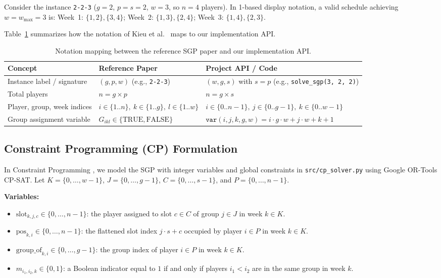 \documentclass[a4paper,fleqn]{cas-sc}
\begin{document}
\begin{example}
Consider the instance \texttt{2-2-3} ($g = 2$, $p = s = 2$, $w = 3$, so $n = 4$ players). In 1-based display notation, a valid schedule achieving $w = w_{\max} = 3$ is: Week~1: $\{1, 2\}, \{3, 4\}$; Week~2: $\{1, 3\}, \{2, 4\}$; Week~3: $\{1, 4\}, \{2, 3\}$.
\end{example}

Table~\ref{tab:notation_map} summarizes how the notation of Kieu et al.~\cite{kieu2025nse} maps to our implementation API.

\begin{table}[pos=!htb]
\centering\footnotesize
\setlength{\tabcolsep}{4pt}
\renewcommand{\arraystretch}{0.85}
\caption{Notation mapping between the reference SGP paper \cite{kieu2025nse} and our implementation API.}
\label{tab:notation_map}
\begin{tabular}{lll}
\toprule
\textbf{Concept} & \textbf{Reference Paper \cite{kieu2025nse}} & \textbf{Project API / Code} \\
\midrule
Instance label / signature & $(g, p, w)$ (e.g., \texttt{2-2-3}) & $(w, g, s)$ with $s = p$ (e.g., \texttt{solve\_sgp(3, 2, 2)}) \\
Total players & $n = g \times p$ & $n = g \times s$ \\
Player, group, week indices & $i \in \{1..n\},\ k \in \{1..g\},\ l \in \{1..w\}$ & $i \in \{0..n{-}1\},\ j \in \{0..g{-}1\},\ k \in \{0..w{-}1\}$ \\
Group assignment variable & $G_{ikl} \in \{\text{TRUE}, \text{FALSE}\}$ & $\texttt{var}(i,j,k,g,w) = i\cdot g\cdot w + j\cdot w + k + 1$ \\
\bottomrule
\end{tabular}
\end{table}

\subsection{Constraint Programming (CP) Formulation}
\label{sec:cp_formulation}

In Constraint Programming \cite{harvey2005molr,ortools}, we model the SGP with integer variables and global constraints in \texttt{src/cp\_solver.py} using Google OR-Tools CP-SAT. Let $K = \{0, \ldots, w - 1\}$, $J = \{0, \ldots, g - 1\}$, $C = \{0, \ldots, s - 1\}$, and $P = \{0, \ldots, n - 1\}$.

\noindent\textbf{Variables:}
\begin{itemize}[noitemsep]
    \item $\text{slot}_{k,j,c} \in \{0, \ldots, n - 1\}$: the player assigned to slot $c \in C$ of group $j \in J$ in week $k \in K$.
    \item $\text{pos}_{k,i} \in \{0, \ldots, n - 1\}$: the flattened slot index $j \cdot s + c$ occupied by player $i \in P$ in week $k \in K$.
    \item $\text{group\_of}_{k,i} \in \{0, \ldots, g - 1\}$: the group index of player $i \in P$ in week $k \in K$.
    \item $m_{i_1,i_2,k} \in \{0, 1\}$: a Boolean indicator equal to $1$ if and only if players $i_1 < i_2$ are in the same group in week $k$.
\end{itemize}
\end{document}
